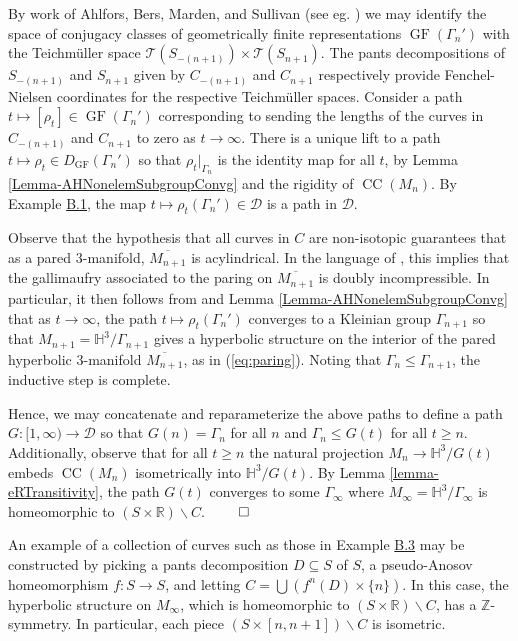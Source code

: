 \documentclass[11pt,leqno]{article}
\DeclareMathOperator{\GF}{GF}
\DeclareMathOperator{\CC}{CC}
\theoremstyle{introdef}
\numberwithin{lemma}{section}
\theoremstyle{definition}
\newcommand{\R}{\mathbb{R}}
\newcommand{\Z}{\mathbb{Z}}
\begin{document}
By work of Ahlfors, Bers, Marden, and Sullivan (see eg. \cite{MAT}) we may identify the space of conjugacy classes of geometrically finite representations $\GF(\Gamma_n')$ with the Teichm\"{u}ller space $\mathcal{T}(S_{-(n+1)})\times \mathcal{T}(S_{n+1})$. The pants decompositions of $S_{-(n+1)}$ and $S_{n+1}$ given by $C_{-(n+1)}$ and $C_{n+1}$ respectively provide Fenchel-Nielsen coordinates \cite{BEN} for the respective Teichm\"{u}ller spaces. Consider a path $t\mapsto[\rho_t]\in \GF(\Gamma_n')$ corresponding to sending the lengths of the curves in $C_{-(n+1)}$ and $C_{n+1}$ to zero as $t\rightarrow\infty$. There is a unique lift to a path $t\mapsto\rho_t\in D_{\GF}(\Gamma_n')$ so that $\rho_t|_{\Gamma_n}$ is the identity map for all $t$, by Lemma \ref{Lemma-AHNonelemSubgroupConvg} and the rigidity of $\CC(M_n)$. By Example \hyperlink{Ex-QCDef}{B.1}, the map $t\mapsto\rho_t(\Gamma_n')\in\mathcal{D}$ is a path in $\mathcal{D}$.\par

Observe that the hypothesis that all curves in $C$ are non-isotopic guarantees that as a pared $3$-manifold, $\overline{M_{n+1}}$ is acylindrical. In the language of \cite{EGG}, this implies that the gallimaufry associated to the paring on $\overline{M_{n+1}}$ is doubly incompressible. In particular, it then follows from \cite{EGG} and Lemma \ref{Lemma-AHNonelemSubgroupConvg} that as $t\rightarrow\infty$, the path $t\mapsto\rho_t(\Gamma_n')$ converges to a Kleinian group $\Gamma_{n+1}$ so that $M_{n+1}=\mathbb{H}^3/\Gamma_{n+1}$ gives a hyperbolic structure on the interior of the pared hyperbolic $3$-manifold $\overline{M_{n+1}}$, as in (\ref{eq:paring}). Noting that $\Gamma_{n}\leq\Gamma_{n+1}$, the inductive step is complete.\par


Hence, we may concatenate and reparameterize the above paths to define a path $G:[1,\infty)\rightarrow\mathcal{D}$ so that $G(n)=\Gamma_n$ for all $n$ and $\Gamma_n\leq G(t)$ for all $t\geq n$. Additionally, observe that for all $t\geq n$ the natural projection $M_n\rightarrow \mathbb{H}^3/G(t)$ embeds $\CC(M_n)$ isometrically into $\mathbb{H}^3/G(t)$. By Lemma \ref{lemma-eRTransitivity}, the path $G(t)$ converges to some $\Gamma_\infty$ where $M_\infty=\mathbb{H}^3/\Gamma_\infty$ is homeomorphic to $(S\times\R)\backslash C$. $\qed$\par

An example of a collection of curves such as those in Example \hyperlink{Ex-NonTame}{B.3} may be constructed by picking a pants decomposition $D\subseteq S$ of $S$, a pseudo-Anosov homeomorphism $f:S\rightarrow S$, and letting $C=\bigcup(f^n(D)\times\{n\})$. In this case, the hyperbolic structure on $M_\infty$, which is homeomorphic to $(S\times\R)\backslash C$, has a $\Z$-symmetry. In particular, each piece $(S\times[n,n+1])\backslash C$ is isometric.\par
\end{document}
